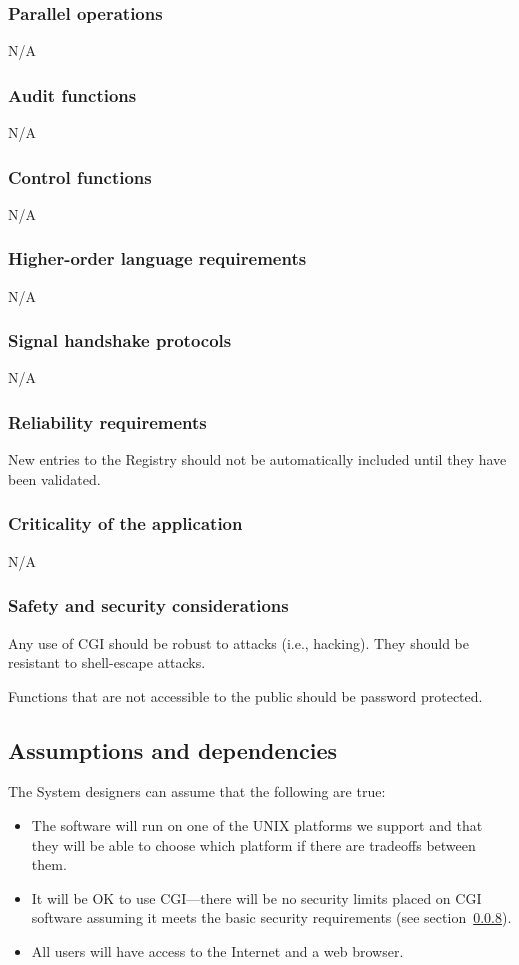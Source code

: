 \documentclass{article}
\begin{document}
\subsubsection{Parallel operations}
N/A 

\subsubsection{Audit functions}
N/A 

\subsubsection{Control functions}
N/A 

\subsubsection{Higher-order language requirements}
N/A 

\subsubsection{Signal handshake protocols}
N/A 

\subsubsection{Reliability requirements}
New entries to the Registry should not be automatically included until they
have been validated.

\subsubsection{Criticality of the application}
N/A 

\subsubsection{Safety and security considerations}
\label{sec:security}
Any use of \ac{CGI} should be robust to attacks (i.e., hacking). They should
be resistant to shell-escape attacks.

Functions that are not accessible to the public should be password protected.

\subsection{Assumptions and dependencies}
The System designers can assume that the following are true:
\begin{itemize}
\item The software will run on one of the UNIX platforms we support and that
  they will be able to choose which platform if there are tradeoffs between
  them.
\item It will be OK to use \ac{CGI}---there will be no security limits placed
  on CGI software assuming it meets the basic security requirements (see
  section~\ref{sec:security}).
\item All users will have access to the Internet and a web browser.
\end{itemize}
\end{document}
